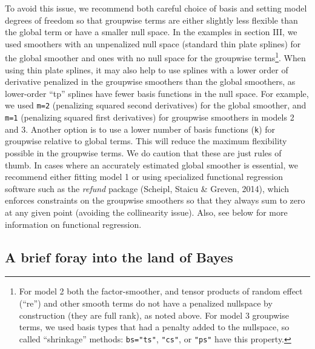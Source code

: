 \documentclass[12pt]{article}
\let\rmarkdownfootnote\footnote%
\def\footnote{\protect\rmarkdownfootnote}
\begin{document}
To avoid this issue, we recommend both careful choice of basis and
setting model degrees of freedom so that groupwise terms are either
slightly less flexible than the global term or have a smaller null
space. In the examples in section III, we used smoothers with an
unpenalized null space (standard thin plate splines) for the global
smoother and ones with no null space for the groupwise terms\footnote{For
  model 2 both the factor-smoother, and tensor products of random effect
  (``re'') and other smooth terms do not have a penalized nullspace by
  construction (they are full rank), as noted above. For model 3
  groupwise terms, we used basis types that had a penalty added to the
  nullspace, so called ``shrinkage'' methods: \texttt{bs="ts"},
  \texttt{"cs"}, or \texttt{"ps"} have this property.}. When using thin
plate splines, it may also help to use splines with a lower order of
derivative penalized in the groupwise smoothers than the global
smoothers, as lower-order ``tp'' splines have fewer basis functions in
the null space. For example, we used \texttt{m=2} (penalizing squared
second derivatives) for the global smoother, and \texttt{m=1}
(penalizing squared first derivatives) for groupwise smoothers in models
2 and 3. Another option is to use a lower number of basis functions
(\texttt{k}) for groupwise relative to global terms. This will reduce
the maximum flexibility possible in the groupwise terms. We do caution
that these are just rules of thumb. In cases where an accurately
estimated global smoother is essential, we recommend either fitting
model 1 or using specialized functional regression software such as the
\emph{refund} package (Scheipl, Staicu \& Greven, 2014), which enforces
constraints on the groupwise smoothers so that they always sum to zero
at any given point (avoiding the collinearity issue). Also, see below
for more information on functional regression.

\subsection{A brief foray into the land of
Bayes}\label{a-brief-foray-into-the-land-of-bayes}
\end{document}
